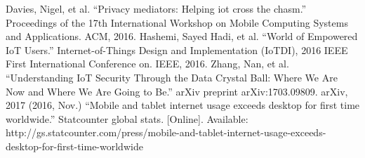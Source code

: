  Davies, Nigel, et al. ``Privacy mediators: Helping iot cross the chasm.'' Proceedings of the 17th International Workshop on Mobile Computing Systems and Applications. ACM, 2016.
 Hashemi, Sayed Hadi, et al. ``World of Empowered IoT Users.'' Internet-of-Things Design and Implementation (IoTDI), 2016 IEEE First International Conference on. IEEE, 2016.
 Zhang, Nan, et al. ``Understanding IoT Security Through the Data Crystal Ball: Where We Are Now and Where We Are Going to Be.'' arXiv preprint arXiv:1703.09809. arXiv, 2017
 (2016, Nov.) ``Mobile and tablet internet usage exceeds desktop for first time worldwide.'' Statcounter global stats. [Online]. Available: http://gs.statcounter.com/press/mobile-and-tablet-internet-usage-exceeds-desktop-for-first-time-worldwide

